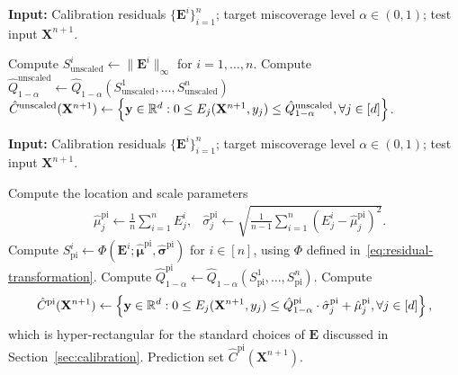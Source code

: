 \begin{algorithm}[!htb]
    \caption{Prediction Intervals via Dimension Reduction with $\ell_\infty$-Norm (Unscaled)}
    \label{alg:unscaled}
    \textbf{Input:} Calibration residuals $\{\mathbf{E}^i\}_{i=1}^{n}$; target miscoverage level $\alpha\in(0,1)$; test input $\mathbf{X}^{n+1}$.
    \begin{algorithmic}[1]
        \State Compute $S^i_{\mathrm{unscaled}} \gets \|\mathbf{E}^i\|_\infty$ for $i = 1,\ldots,n$.
        \State Compute $\hat{Q}^{\mathrm{unscaled}}_{1-\alpha} \gets \hat{Q}_{1-\alpha}(S^1_{\mathrm{unscaled}},\dots, S^n_{\mathrm{unscaled}})$
        \State \Return $\hat{C}^{\mathrm{unscaled}}(\mathbf{X}^{n+1}) \gets \left\{\mathbf y \in \mathbb{R}^d: 0 \leq E_j(\mathbf{X}^{n+1},y_j) \leq \hat{Q}^{\mathrm{unscaled}}_{1-\alpha}, \forall j \in [d]\right\}$.
    \end{algorithmic}
\end{algorithm}

\begin{algorithm}[!htb]
    \caption{Heuristic Plug-In Standardization}
    \label{alg:std-plug-in}
    \textbf{Input:} Calibration residuals $\{\mathbf{E}^i\}_{i=1}^{n}$; target miscoverage level $\alpha\in(0,1)$; test input $\mathbf{X}^{n+1}$.
    \begin{algorithmic}[1]
            \State Compute the location and scale parameters
            \begin{align*}
            & \hat{\mu}^{\mathrm{pi}}_j \gets \frac{1}{n}\sum_{i=1}^{n} E^i_j,
              & \hat{\sigma}^{\mathrm{pi}}_j \gets \sqrt{\frac{1}{n-1}\sum_{i=1}^{n}(E^i_j-\hat{\mu}^{\mathrm{pi}}_j)^2}.
            \end{align*}
            \EndFor
        \State Compute $S^i_{\mathrm{pi}} \gets \Phi(\mathbf{E}^i; \hat{\boldsymbol\mu}^{\mathrm{pi}},\hat{\boldsymbol\sigma}^{\mathrm{pi}})$ for $i \in [n]$, using $\Phi$ defined in~\eqref{eq:residual-transformation}.
        \State Compute $\hat{Q}^\mathrm{pi}_{1-\alpha}\gets \hat{Q}_{1-\alpha}(S^1_\mathrm{pi},\dots, S^n_\mathrm{pi}).$
        \State Compute 
            \begin{align*}
\hat{C}^{\mathrm{pi}}(\mathbf{X}^{n+1}) \gets \left\{\mathbf y \in \mathbb{R}^d: 0 \leq E_j(\mathbf{X}^{n+1}, y_j) \leq \hat{Q}^\mathrm{pi}_{1-\alpha}\cdot \hat{\sigma}^\mathrm{pi}_j + \hat{\mu}^\mathrm{pi}_j, \forall j \in [d]\right\},
            \end{align*}
            which is hyper-rectangular for the standard choices of $\mathbf E$ discussed in Section~\ref{sec:calibration}.
            \State \Return Prediction set $\hat{C}^{\mathrm{pi}}(\mathbf{X}^{n+1})$.
    \end{algorithmic}
\end{algorithm}

